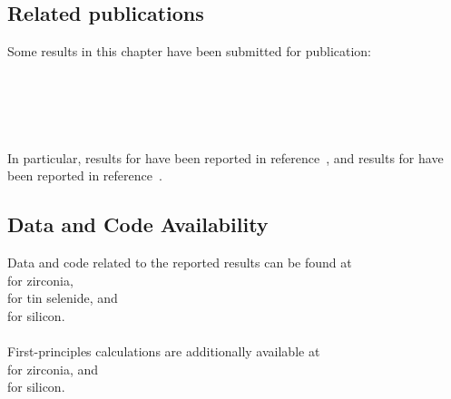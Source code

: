 \subsection*{Related publications}
Some results in this chapter have been submitted for publication:
\\\\
\PaperHF
\\\\
\PaperGLP
\\\\
In particular, results for  have been reported in reference~\cite{lksr2023a}, and results for  have been reported in reference~\cite{lfk2023a}.

\subsection*{Data and Code Availability}
Data and code related to the reported results can be found at\\
 for zirconia,\\
 for tin selenide, and\\
 for silicon.\\
\\
First-principles calculations are additionally available at\\
 for zirconia, and\\
 for silicon.
